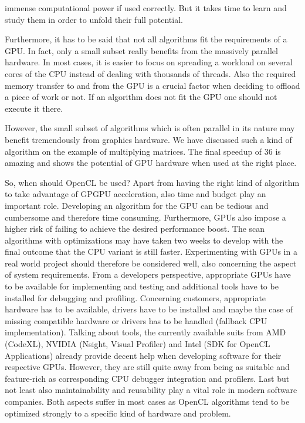 immense computational power if used correctly. But it takes time to learn and study them in order to unfold their full potential.

Furthermore, it has to be said that not all algorithms fit the requirements of a GPU. In fact, only a small subset really benefits from the massively parallel hardware. In most cases, it is easier to focus on spreading a workload on several cores of the CPU instead of dealing with thousands of threads. Also the required memory transfer to and from the GPU is a crucial factor when deciding to offload a piece of work or not. If an algorithm does not fit the GPU one should not execute it there.

However, the small subset of algorithms which is often parallel in its nature may benefit tremendously from graphics hardware. We have discussed such a kind of algorithm on the example of multiplying matrices. The final speedup of 36 is amazing and shows the potential of GPU hardware when used at the right place.

So, when should OpenCL be used? Apart from having the right kind of algorithm to take advantage of GPGPU acceleration, also time and budget play an important role. Developing an algorithm for the GPU can be tedious and cumbersome and therefore time consuming. Furthermore, GPUs also impose a higher risk of failing to achieve the desired performance boost. The scan algorithms with optimizations may have taken two weeks to develop with the final outcome that the CPU variant is still faster. Experimenting with GPUs in a real world project should therefore be considered well, also concerning the aspect of system requirements. From a developers perspective, appropriate GPUs have to be available for implementing and testing and additional tools have to be installed for debugging and profiling. Concerning customers, appropriate hardware has to be available, drivers have to be installed and maybe the case of missing compatible hardware or drivers has to be handled (fallback CPU implementation). Talking about tools, the currently available suits from AMD (CodeXL), NVIDIA (Nsight, Visual Profiler) and Intel (SDK for OpenCL Applications) already provide decent help when developing software for their respective GPUs. However, they are still quite away from being as suitable and feature-rich as corresponding CPU debugger integration and profilers. Last but not least also maintainability and reusability play a vital role in modern software companies. Both aspects suffer in most cases as OpenCL algorithms tend to be optimized strongly to a specific kind of hardware and problem.

